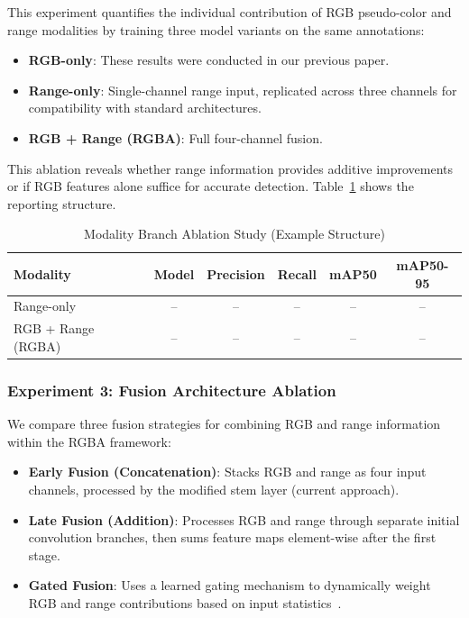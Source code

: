 \documentclass[runningheads]{llncs}
\begin{document}
This experiment quantifies the individual contribution of RGB pseudo-color and range modalities by training three model variants on the same annotations:

\begin{itemize}
    \item \textbf{RGB-only}: These results were conducted in our previous paper.
    \item \textbf{Range-only}: Single-channel range input, replicated across three channels for compatibility with standard architectures.
    \item \textbf{RGB + Range (RGBA)}: Full four-channel fusion.
\end{itemize}

This ablation reveals whether range information provides additive improvements or if RGB features alone suffice for accurate detection. Table~\ref{tab:modality_ablation} shows the reporting structure.

\begin{table}[h!]
    \centering
    \caption{Modality Branch Ablation Study (Example Structure)}
    \label{tab:modality_ablation}
    \begin{tabular}{lccccc}
        \toprule
        \textbf{Modality} & 
        \textbf{Model} &
        \textbf{Precision} & \textbf{Recall} & \textbf{mAP50} & \textbf{mAP50-95}\\
        \midrule
        Range-only          & -- & -- & -- & -- & -- \\
        RGB + Range (RGBA)  & -- & -- & -- & -- & -- \\
        \bottomrule
    \end{tabular}
\end{table}

\subsubsection{Experiment 3: Fusion Architecture Ablation}

We compare three fusion strategies for combining RGB and range information within the RGBA framework:

\begin{itemize}
    \item \textbf{Early Fusion (Concatenation)}: Stacks RGB and range as four input channels, processed by the modified stem layer (current approach).
    \item \textbf{Late Fusion (Addition)}: Processes RGB and range through separate initial convolution branches, then sums feature maps element-wise after the first stage.
    \item \textbf{Gated Fusion}: Uses a learned gating mechanism to dynamically weight RGB and range contributions based on input statistics~\cite{nature2023fusion}.
\end{itemize}
\end{document}
